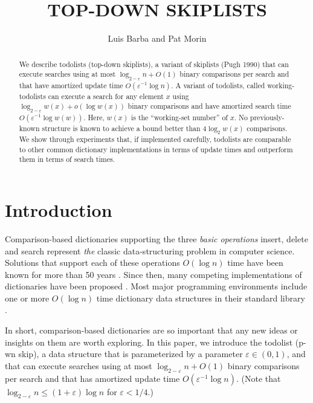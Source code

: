 \documentclass[lotsofwhite]{patmorin}
\title{\MakeUppercase{Top-Down Skiplists}}
\author{Luis Barba and Pat Morin}
\newcommand{\eps}{\varepsilon}
\begin{document}
\begin{titlepage}
\maketitle

\begin{abstract}
  We describe todolists (top-down skiplists), a variant of skiplists
  (Pugh 1990) that can execute searches using at most $\log_{2-\eps} n +
  O(1)$ binary comparisons per search and that have amortized update time
  $O(\eps^{-1}\log n)$. A variant of todolists, called working-todolists
  can execute a search for any element $x$ using $\log_{2-\eps} w(x)
  + o(\log w(x))$ binary comparisons and have amortized search time
  $O(\eps^{-1}\log w(w))$. Here, $w(x)$ is the ``working-set number'' of
  $x$. No previously-known structure is known to achieve a bound better
  than $4\log_2 w(x)$ comparisons. We show through experiments that,
  if implemented carefully, todolists are comparable to other common
  dictionary implementations in terms of update times and outperform
  them in terms of search times.
\end{abstract}

\end{titlepage}

\section{Introduction}

Comparison-based dictionaries supporting the three \emph{basic operations}
insert, delete and search represent \emph{the} classic data-structuring
problem in computer science.  Solutions that support each of these
operations $O(\log n)$ time have been known for more than 50 years
\cite{avl}.  Since then, many competing implementations of dictionaries
have been proposed \cite{X}.  Most major programming environments include
one or more $O(\log n)$ time dictionary data structures in their standard
library \cite{S}.

In short, comparison-based dictionaries are so important that any
new ideas or insights on them are worth exploring.  In this paper,
we introduce the todolist (p-wn skip),
a data structure that is parameterized by a parameter $\eps\in(0,1)$,
and that can execute searches using at most $\log_{2-\eps} n + O(1)$
binary comparisons per search and that has amortized update time
$O(\eps^{-1}\log n)$.  (Note that $\log_{2-\eps} n \le (1+\eps)\log n$ for $\eps < 1/4$.)
\end{document}
